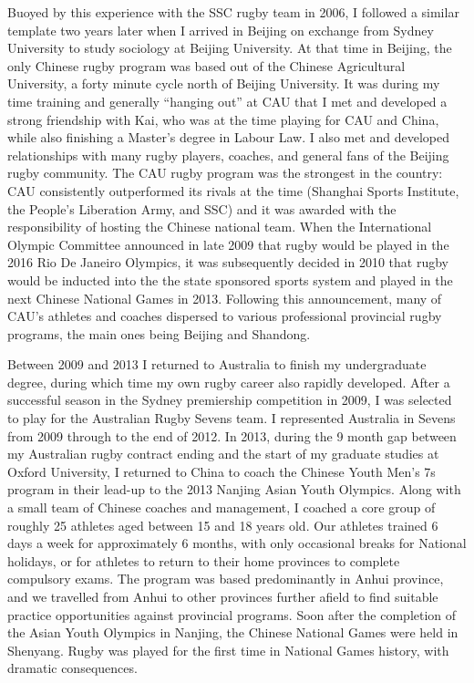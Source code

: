 Buoyed by this experience with the SSC rugby team in 2006, I followed a similar template two years later when I arrived in Beijing on exchange from Sydney University to study sociology at Beijing University.  At that time in Beijing, the only Chinese rugby program was based out of the Chinese Agricultural University, a forty minute cycle north of Beijing University.  It was during my time training and generally ``hanging out'' at CAU that I met and developed a strong friendship with Kai, who was at the time playing for CAU and China, while also finishing a Master's degree in Labour Law.  I also met and developed relationships with many rugby players, coaches, and general fans of the Beijing rugby community.  The CAU rugby program was the strongest in the country: CAU consistently outperformed its rivals at the time (Shanghai Sports Institute, the People's Liberation Army, and SSC) and it was awarded with the responsibility of hosting the Chinese national team.  When the International Olympic Committee announced in late 2009 that rugby would be played in the 2016 Rio De Janeiro Olympics, it was subsequently decided in 2010 that rugby would be inducted into the the state sponsored sports system and played in the next Chinese National Games in 2013.  Following this announcement, many of CAU's athletes and coaches dispersed to various professional provincial rugby programs, the main ones being Beijing and Shandong.

Between 2009 and 2013 I returned to Australia to finish my undergraduate degree, during which time my own rugby career also rapidly developed. After a successful season in the Sydney premiership competition in 2009, I was selected to play for the Australian Rugby Sevens team. I represented Australia in Sevens from 2009 through to the end of 2012.  In 2013, during the 9 month gap between my Australian rugby contract ending and the start of my graduate studies at Oxford University, I returned to China to coach the Chinese Youth Men's 7s program in their lead-up to the 2013 Nanjing Asian Youth Olympics.  Along with a small team of Chinese coaches and management, I coached a core group of roughly 25 athletes aged between 15 and 18 years old. Our athletes trained 6 days a week for approximately 6 months, with only occasional breaks for National holidays, or for athletes to return to their home provinces to complete compulsory exams.  The program was based predominantly in Anhui province, and we travelled from Anhui to other provinces further afield to find suitable practice opportunities against provincial programs.  Soon after the completion of the Asian Youth Olympics in Nanjing, the Chinese National Games were held in Shenyang. Rugby was played for the first time in National Games history, with dramatic consequences.

